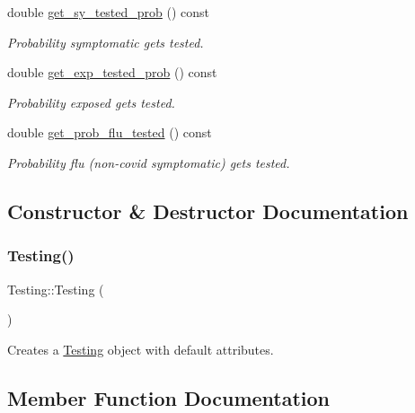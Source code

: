 \begin{DoxyCompactItemize}
$$double \hyperlink{classTesting_aa8c8052e8179abde17276c0ad78fd247}{get\+\_\+sy\+\_\+tested\+\_\+prob} () const
\begin{DoxyCompactList}\small\item\em Probability symptomatic gets tested. \end{DoxyCompactList}\item 
double \hyperlink{classTesting_aa46e6228c0ab63baea9a9453c79fa5f9}{get\+\_\+exp\+\_\+tested\+\_\+prob} () const
\begin{DoxyCompactList}\small\item\em Probability exposed gets tested. \end{DoxyCompactList}\item 
double \hyperlink{classTesting_a0d44f5f729d3725422a748155454a062}{get\+\_\+prob\+\_\+flu\+\_\+tested} () const
\begin{DoxyCompactList}\small\item\em Probability flu (non-\/covid symptomatic) gets tested. \end{DoxyCompactList}\end{DoxyCompactItemize}


\subsection{Constructor \& Destructor Documentation}
\mbox{\label{classTesting_aeeb2ffdd21714053d03aeddc1209649c}} 
\subsubsection{\texorpdfstring{Testing()}{Testing()}}
{\footnotesize\ttfamily Testing\+::\+Testing (\begin{DoxyParamCaption}{ }\end{DoxyParamCaption})\hspace{0.3cm}{\ttfamily [default]}}



Creates a \hyperlink{classTesting}{Testing} object with default attributes. 



\subsection{Member Function Documentation}
\mbox{\label{classTesting_a4d34e310ca89cab5515d6dde01e8183a}} 
